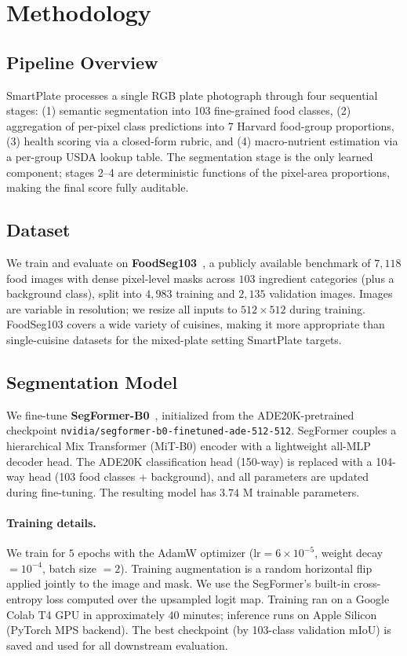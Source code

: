 \section{Methodology}
\label{sec:method}

\subsection{Pipeline Overview}
SmartPlate processes a single RGB plate photograph through four sequential stages:
(1) semantic segmentation into 103 fine-grained food classes,
(2) aggregation of per-pixel class predictions into 7 Harvard food-group proportions,
(3) health scoring via a closed-form rubric,
and (4) macro-nutrient estimation via a per-group USDA lookup table.
The segmentation stage is the only learned component; stages 2--4 are deterministic functions of the pixel-area proportions, making the final score fully auditable.

\subsection{Dataset}
We train and evaluate on \textbf{FoodSeg103}~\cite{wu2021foodseg103}, a publicly available benchmark of $7{,}118$ food images with dense pixel-level masks across $103$ ingredient categories (plus a background class), split into $4{,}983$ training and $2{,}135$ validation images.
Images are variable in resolution; we resize all inputs to $512\times512$ during training.
FoodSeg103 covers a wide variety of cuisines, making it more appropriate than single-cuisine datasets for the mixed-plate setting SmartPlate targets.

\subsection{Segmentation Model}
We fine-tune \textbf{SegFormer-B0}~\cite{xie2021segformer}, initialized from the ADE20K-pretrained checkpoint \texttt{nvidia/segformer-b0-finetuned-ade-512-512}.
SegFormer couples a hierarchical Mix Transformer (MiT-B0) encoder with a lightweight all-MLP decoder head.
The ADE20K classification head (150-way) is replaced with a 104-way head (103 food classes + background), and all parameters are updated during fine-tuning.
The resulting model has $3.74$ M trainable parameters.

\paragraph{Training details.}
We train for $5$ epochs with the AdamW optimizer ($\text{lr}=6\times10^{-5}$, weight decay $= 10^{-4}$, batch size $= 2$).
Training augmentation is a random horizontal flip applied jointly to the image and mask.
We use the SegFormer's built-in cross-entropy loss computed over the upsampled logit map.
Training ran on a Google Colab T4 GPU in approximately $40$ minutes; inference runs on Apple Silicon (PyTorch MPS backend).
The best checkpoint (by 103-class validation mIoU) is saved and used for all downstream evaluation.


